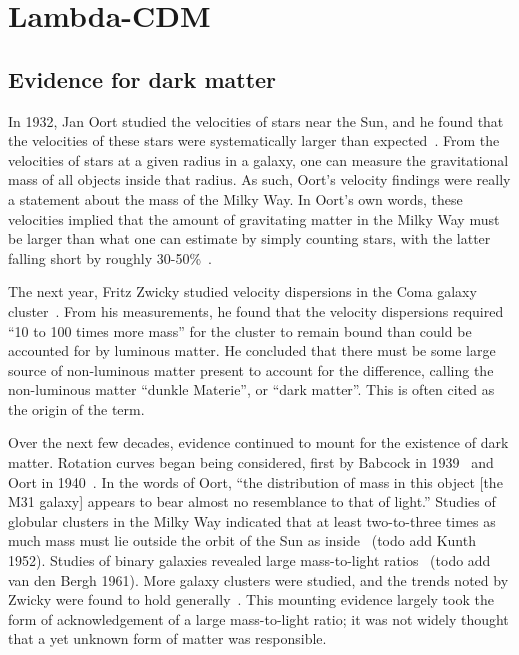 \hypertarget{lambda-cdm}{%
\chapter{Lambda-CDM}\label{lambda-cdm}}

\hypertarget{evidence-for-dark-matter}{%
\section{Evidence for dark matter}\label{evidence-for-dark-matter}}

In 1932, Jan Oort studied the velocities of stars near the Sun, and he found
that the velocities of these stars were systematically larger than
expected~\cite{oort_force_1932}. From the velocities of stars at a given
radius in a galaxy, one can measure the gravitational mass of all objects
inside that radius. As such, Oort's velocity findings were really a statement
about the mass of the Milky Way. In Oort's own words, these velocities implied
that the amount of gravitating matter in the Milky Way must be larger than
what one can estimate by simply counting stars, with the latter falling short
by roughly 30-50\%~\cite{trimble_existence_1987}.

The next year, Fritz Zwicky studied velocity dispersions in the Coma galaxy
cluster~\cite{zwicky_rotverschiebung_1933,andernach_english_2017}. From his
measurements, he found that the velocity dispersions required ``10 to 100
times more mass'' for the cluster to remain bound than could be accounted for
by luminous matter. He concluded that there must be some large source of
non-luminous matter present to account for the difference, calling the
non-luminous matter ``dunkle Materie'', or ``dark matter''. This is often
cited as the origin of the term.

Over the next few decades, evidence continued to mount for the existence of
dark matter. Rotation curves began being considered, first by Babcock in
1939~\cite{babcock_rotation_1939} and Oort in 1940~\cite{oort_problems_1940}.
In the words of Oort, ``the distribution of mass in this object [the M31
galaxy] appears to bear almost no resemblance to that of light.'' Studies of
globular clusters in the Milky Way indicated that at least two-to-three times
as much mass must lie outside the orbit of the Sun as
inside~\cite{lohmann_masse_1956} (todo add Kunth 1952). Studies of binary
galaxies revealed large mass-to-light
ratios~\cite{page_average_1960,holmberg_masses_1954} (todo add van den Bergh
1961). More galaxy clusters were studied, and the trends noted by Zwicky were
found to hold generally~\cite{trimble_history_2013}. This mounting evidence largely
took the form of acknowledgement of a large mass-to-light ratio; it was not
widely thought that a yet unknown form of matter was responsible.

